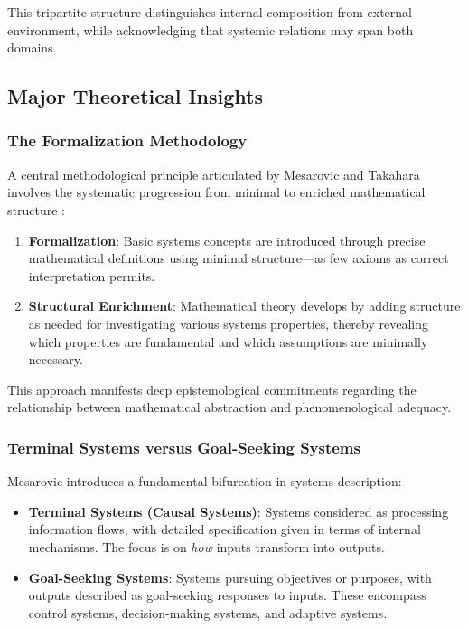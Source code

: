 This tripartite structure distinguishes internal composition from external environment, while acknowledging that systemic relations may span both domains.

\subsection{Major Theoretical Insights}

\subsubsection{The Formalization Methodology}

A central methodological principle articulated by Mesarovic and Takahara involves the systematic progression from minimal to enriched mathematical structure \citep{mesarovic1975mathematical}:

\begin{enumerate}
\item \textbf{Formalization}: Basic systems concepts are introduced through precise mathematical definitions using minimal structure---as few axioms as correct interpretation permits.
\item \textbf{Structural Enrichment}: Mathematical theory develops by adding structure as needed for investigating various systems properties, thereby revealing which properties are fundamental and which assumptions are minimally necessary.
\end{enumerate}

This approach manifests deep epistemological commitments regarding the relationship between mathematical abstraction and phenomenological adequacy.

\subsubsection{Terminal Systems versus Goal-Seeking Systems}

Mesarovic \citep{mesarovic1972conceptual} introduces a fundamental bifurcation in systems description:

\begin{itemize}
\item \textbf{Terminal Systems (Causal Systems)}: Systems considered as processing information flows, with detailed specification given in terms of internal mechanisms. The focus is on \emph{how} inputs transform into outputs.

\item \textbf{Goal-Seeking Systems}: Systems pursuing objectives or purposes, with outputs described as goal-seeking responses to inputs. These encompass control systems, decision-making systems, and adaptive systems.
\end{itemize}

